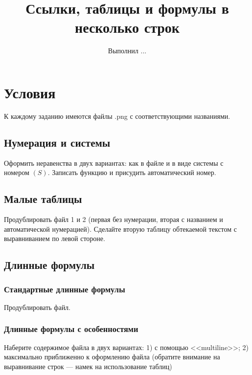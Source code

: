 \documentclass[a4paper,12pt]{article} %
\author{Выполнил ...}
\title{Ссылки, таблицы и формулы в несколько строк}
\begin{document}

\maketitle


\section{Условия}

К каждому заданию имеются файлы .png с соответствующими названиями.



\subsection{Нумерация и системы}

Оформить неравенства в двух вариантах: как в файле и в виде системы с номером $(S)$. Записать функцию и присудить автоматический номер.



\subsection{Малые таблицы}

Продублировать файл 1 и 2 (первая без нумерации, вторая с названием и автоматической нумерацией). Сделайте вторую таблицу обтекаемой текстом с выравниванием по левой стороне.




\subsection{Длинные формулы}

\subsubsection{Стандартные длинные формулы}

Продублировать файл.


\subsubsection{Длинные формулы с особенностями}

Наберите содержимое файла в двух вариантах: 1) с помощью <<multiline>>; 2) максимально приближенно к оформлению файла (обратите внимание на выравнивание строк --- намек на использование таблиц)
\end{document}
